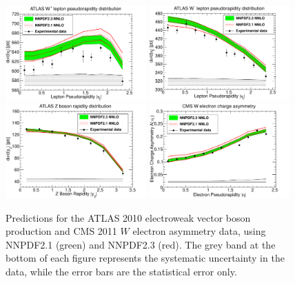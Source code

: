 \begin{figure}[h!]
\centering
\includegraphics[width=0.48\textwidth]{6-LHCimpact/figs/ATLASWZRAP36PB_0.pdf}
\includegraphics[width=0.48\textwidth]{6-LHCimpact/figs/ATLASWZRAP36PB_1.pdf}
\includegraphics[width=0.48\textwidth]{6-LHCimpact/figs/ATLASWZRAP36PB_2.pdf}
\includegraphics[width=0.48\textwidth]{6-LHCimpact/figs/CMSWEASY840PB_0.pdf}
\caption[Predictions for the ATLAS 2010 electroweak vector boson production and CMS 2011 $W$ electron asymmetry data, using NNPDF2.1 and NNPDF2.3]{Predictions for the ATLAS 2010 electroweak vector boson production and CMS 2011 $W$ electron asymmetry data, using NNPDF2.1 (green) and NNPDF2.3 (red). The grey band at the bottom of each figure represents the systematic uncertainty in the data, while the error bars are the statistical error only.}
\label{fig:ATLASplusCMSwzpred}
\end{figure}

